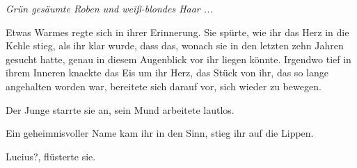 \emph{Grün gesäumte Roben und weiß-blondes Haar ...}

Etwas Warmes regte sich in ihrer Erinnerung. Sie spürte, wie ihr das Herz in die
Kehle stieg, als ihr klar wurde, dass das, wonach sie in den letzten zehn Jahren
gesucht hatte, genau in diesem Augenblick vor ihr liegen könnte. Irgendwo tief
in ihrem Inneren knackte das Eis um ihr Herz, das Stück von ihr, das so lange
angehalten worden war, bereitete sich darauf vor, sich wieder zu bewegen.

Der Junge starrte sie an, sein Mund arbeitete lautlos.

Ein geheimnisvoller Name kam ihr in den Sinn, stieg ihr auf die Lippen.

\glqq{}Lucius?\grqq{}, flüsterte sie.

